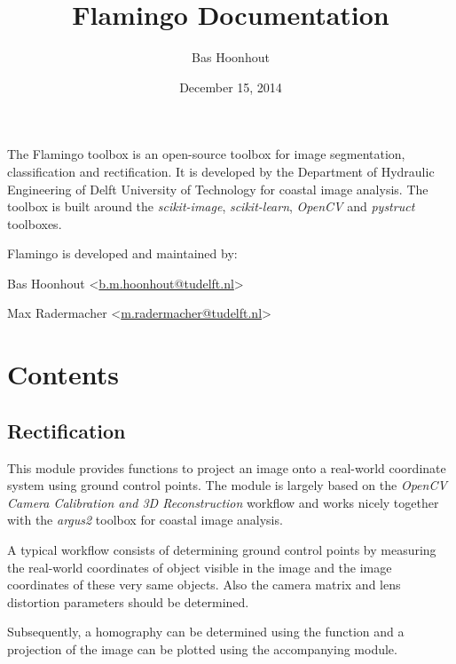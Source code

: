 \documentclass[letterpaper,10pt,english]{sphinxmanual}
\title{Flamingo Documentation}
\date{December 15, 2014}
\author{Bas Hoonhout}
\begin{document}
\maketitle
\tableofcontents
{}\label{index::doc}


The Flamingo toolbox is an open-source toolbox for image segmentation, classification and rectification.
It is developed by the Department of Hydraulic Engineering of Delft University of Technology for coastal image analysis.
The toolbox is built around the \emph{scikit-image}, \emph{scikit-learn}, \emph{OpenCV} and \emph{pystruct} toolboxes.

Flamingo is developed and maintained by:

\begin{DUlineblock}{0em}
\item[] Bas Hoonhout \textless{}\href{mailto:b.m.hoonhout@tudelft.nl}{b.m.hoonhout@tudelft.nl}\textgreater{}
\item[] Max Radermacher \textless{}\href{mailto:m.radermacher@tudelft.nl}{m.radermacher@tudelft.nl}\textgreater{}
\end{DUlineblock}


\chapter{Contents}
\label{index:contents}\label{index:welcome-to-flamingo-s-documentation}

\section{Rectification}
\label{flamingo/rectification/index:rectification}\label{flamingo/rectification/index::doc}
This module provides functions to project an image onto a
real-world coordinate system using ground control points. The
module is largely based on the \emph{OpenCV Camera Calibration and 3D
Reconstruction} workflow and works nicely together with the \emph{argus2}
toolbox for coastal image analysis.

A typical workflow consists of determining ground control points
by measuring the real-world coordinates of object visible in the
image and the image coordinates of these very same objects. Also
the camera matrix and lens distortion parameters should be
determined.

Subsequently, a homography can be determined using the
{\hyperref[flamingo/rectification/index:flamingo.rectification.rectification.find_homography]{}} function and a projection of the image can be
plotted using the accompanying {\hyperref[flamingo/rectification/index:module-flamingo.rectification.plot]{}} module.
\end{document}
